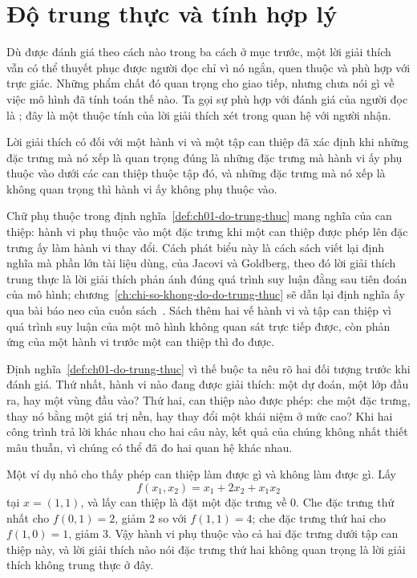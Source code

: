 \section{Độ trung thực và tính hợp lý}
\label{sec:ch01-do-trung-thuc-va-tinh-hop-ly}

%
Dù được đánh giá theo cách nào trong ba cách ở mục trước, một lời giải thích
vẫn có thể thuyết phục được người đọc chỉ vì nó ngắn, quen thuộc và phù hợp
với trực giác. Những phẩm chất đó quan trọng cho giao tiếp, nhưng chưa nói gì
về việc mô hình đã tính toán thế nào. Ta gọi sự phù hợp với đánh giá của
người đọc là ; đây là một thuộc tính của lời
giải thích xét trong quan hệ với người nhận.

%
\begin{definition}
\label{def:ch01-do-trung-thuc}
Lời giải thích có  đối với một hành vi và một
tập can thiệp đã xác định khi những đặc trưng mà nó xếp là quan trọng đúng là
những đặc trưng mà hành vi ấy phụ thuộc vào dưới các can thiệp thuộc tập đó,
và những đặc trưng mà nó xếp là không quan trọng thì hành vi ấy không phụ
thuộc vào.
\end{definition}

Chữ phụ thuộc trong định nghĩa~\ref{def:ch01-do-trung-thuc} mang nghĩa của
can thiệp: hành vi phụ thuộc vào một đặc trưng khi một can thiệp được phép lên
đặc trưng ấy làm hành vi thay đổi. Cách phát biểu này là cách sách viết lại
định nghĩa mà phần lớn tài liệu dùng, của Jacovi và Goldberg, theo đó lời
giải thích trung thực là lời giải thích phản ánh đúng quá trình suy luận đằng
sau tiên đoán của mô hình; chương~\ref{ch:chi-so-khong-do-do-trung-thuc} sẽ
dẫn lại định nghĩa ấy qua bài báo neo của cuốn sách~\autocite{p21metrics}.
Sách thêm hai vế hành vi và tập can thiệp vì quá trình suy luận của một mô
hình không quan sát trực tiếp được, còn phản ứng của một hành vi trước một can
thiệp thì đo được.

Định nghĩa~\ref{def:ch01-do-trung-thuc} vì thế buộc ta nêu rõ hai đối tượng
trước khi đánh giá. Thứ nhất, hành vi nào đang được giải thích: một dự đoán, một
lớp đầu ra, hay một vùng đầu vào? Thứ hai, can thiệp nào được phép: che một
đặc trưng, thay nó bằng một giá trị nền, hay thay đổi một khái niệm ở mức
cao? Khi hai công trình trả lời khác nhau cho hai câu này, kết quả của chúng
không nhất thiết mâu thuẫn, vì chúng có thể đã đo hai quan hệ khác nhau.

Một ví dụ nhỏ cho thấy phép can thiệp làm được gì và không làm được gì. Lấy
\[
  f(x_1,x_2) = x_1 + 2x_2 + x_1 x_2
\]
tại $x = (1,1)$, và lấy can thiệp là đặt một đặc trưng về 0. Che đặc trưng thứ
nhất cho $f(0,1) = 2$, giảm 2 so với $f(1,1) = 4$; che đặc trưng thứ hai cho
$f(1,0) = 1$, giảm 3. Vậy hành vi phụ thuộc vào cả hai đặc trưng dưới tập can
thiệp này, và lời giải thích nào nói đặc trưng thứ hai không quan trọng là lời
giải thích không trung thực ở đây.

